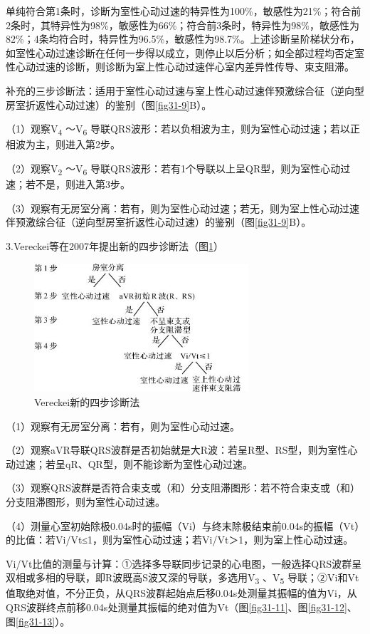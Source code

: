 单纯符合第1条时，诊断为室性心动过速的特异性为100\%，敏感性为21\%；符合前2条时，其特异性为98\%，敏感性为66\%；符合前3条时，特异性为98\%，敏感性为82\%；4条均符合时，特异性为96.5\%，敏感性为98.7\%。上述诊断呈阶梯状分布，如室性心动过速诊断在任何一步得以成立，则停止以后分析；如全部过程均否定室性心动过速的诊断，则诊断为室上性心动过速伴心室内差异性传导、束支阻滞。

补充的三步诊断法：适用于室性心动过速与室上性心动过速伴预激综合征（逆向型房室折返性心动过速）的鉴别（图\ref{fig31-9}B）。

（1）观察V\textsubscript{4} ～V\textsubscript{6}
导联QRS波形：若以负相波为主，则为室性心动过速；若以正相波为主，则进入第2步。

（2）观察V\textsubscript{2} ～V\textsubscript{6}
导联QRS波形：若有1个导联以上呈QR型，则为室性心动过速；若不是，则进入第3步。

（3）观察有无房室分离：若有，则为室性心动过速；若无，则为室上性心动过速伴预激综合征（逆向型房室折返性心动过速）的鉴别（图\ref{fig31-9}B）。

3.Vereckei等在2007年提出新的四步诊断法（图\ref{fig31-10}）

\begin{figure}[!htbp]
 \centering
 \includegraphics[width=3.13542in,height=1.88542in]{./images/Image00513.jpg}
 \captionsetup{justification=centering}
 \caption{Vereckei新的四步诊断法}
 \label{fig31-10}
  \end{figure} 

（1）观察有无房室分离：若有，则为室性心动过速。

（2）观察aVR导联QRS波群是否初始就是大R波：若呈R型、RS型，则为室性心动过速；若呈qR、QR型，则不能诊断为室性心动过速。

（3）观察QRS波群是否符合束支或（和）分支阻滞图形：若不符合束支或（和）分支阻滞图形，则为室性心动过速。

（4）测量心室初始除极0.04s时的振幅（Vi）与终末除极结束前0.04s的振幅（Vt）的比值：若Vi/Vt≤1，则为室性心动过速；若Vi/Vt＞1，则为室上性心动过速。

Vi/Vt比值的测量与计算：①选择多导联同步记录的心电图，一般选择QRS波群呈双相或多相的导联，即R波既高S波又深的导联，多选用V\textsubscript{3}
、V\textsubscript{5}
导联；②Vi和Vt值取绝对值，不分正负，从QRS波群起始点后移0.04s处测量其振幅的值为Vi，从QRS波群终点前移0.04s处测量其振幅的绝对值为Vt（图\ref{fig31-11}、图\ref{fig31-12}、图\ref{fig31-13}）。

